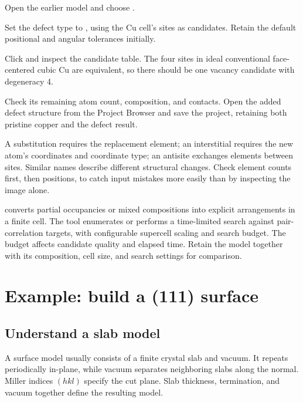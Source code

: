 \begin{steps}
  \item Open the earlier  model and choose .
  \item Set the defect type to , using the Cu cell's sites as candidates. Retain the default positional and angular tolerances initially.
  \item Click  and inspect the candidate table. The four sites in ideal conventional face-centered cubic Cu are equivalent, so there should be one vacancy candidate with degeneracy 4.
  \item Check its remaining atom count, composition, and contacts. Open the added defect structure from the Project Browser and save the project, retaining both pristine copper and the defect result.
\end{steps}

A substitution requires the replacement element; an interstitial requires the new atom's coordinates and coordinate type; an antisite exchanges elements between sites. Similar names describe different structural changes. Check element counts first, then positions, to catch input mistakes more easily than by inspecting the image alone.

 converts partial occupancies or mixed compositions into explicit arrangements in a finite cell. The tool enumerates or performs a time-limited search against pair-correlation targets, with configurable supercell scaling and search budget. The budget affects candidate quality and elapsed time. Retain the model together with its composition, cell size, and search settings for comparison.

\section{Example: build a (111) surface}

\subsection{Understand a slab model}

A surface model usually consists of a finite crystal slab and vacuum. It repeats periodically in-plane, while vacuum separates neighboring slabs along the normal. Miller indices $(hkl)$ specify the cut plane. Slab thickness, termination, and vacuum together define the resulting model.

